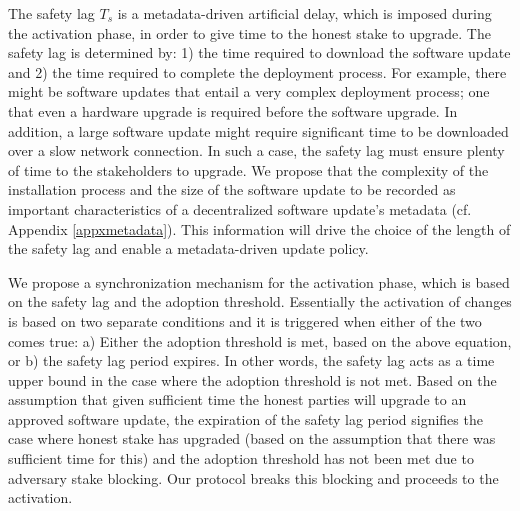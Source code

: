 {%
The safety lag $T_s$ is a metadata-driven artificial delay, which is imposed during the activation phase, in order to give time to the honest stake to upgrade. The safety lag is determined by: 1) the time required to download the software update and 2) the time required to complete the deployment process.
 For example, there might be software updates that entail a very complex deployment process; one that even  a hardware upgrade is required before the software upgrade. In addition, a large software update might require significant time to be downloaded over a slow network connection. In such a case, the safety lag must ensure plenty of time to the stakeholders to upgrade.  
We propose that the complexity of the installation process and the size of the software update to be recorded as important characteristics of a decentralized software update's metadata (cf. Appendix \ref{appxmetadata}). This information will drive the choice of the length of the safety lag and enable a metadata-driven update policy.


We propose a synchronization mechanism for the activation phase, which is based on the safety lag and the adoption threshold. Essentially the activation of changes is based on two separate conditions and it is triggered when either of the two comes true: a) Either the adoption threshold is met, based on the above equation, or b) the safety lag period expires. In other words, the safety lag acts as a time upper bound in the case where the adoption threshold is not met. Based on the assumption that given sufficient time %
the honest parties will upgrade to an approved software update, the expiration of the safety lag period signifies the case where honest stake has upgraded (based on the assumption that there was sufficient time for this) and the adoption threshold has not been met due to adversary stake blocking. Our protocol breaks this blocking and proceeds to the activation. 

}
